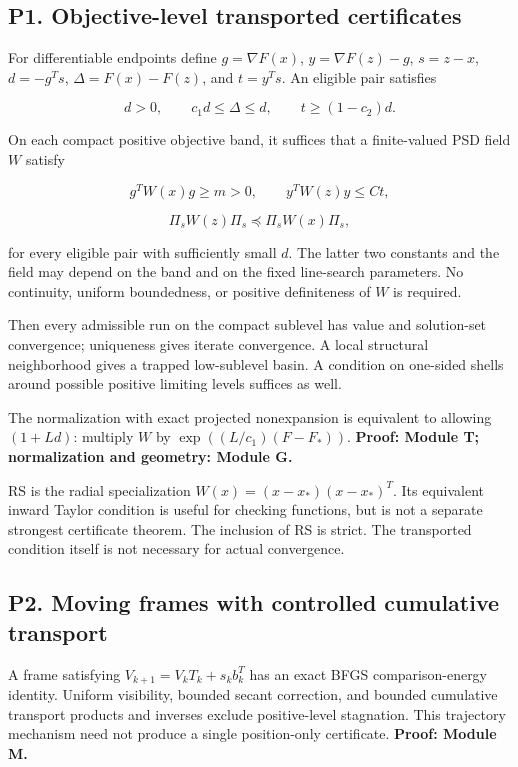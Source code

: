 \documentclass[10pt,oneside,openany]{book}
\theoremstyle{remark}\newtheorem{remark}{Remark}[chapter]
\begin{document}
\subsection{P1. Objective-level transported certificates}\label{p1.-objective-level-transported-certificates}

For differentiable endpoints define \(g=\nabla F(x)\), \(y=\nabla F(z)-g\), \(s=z-x\), \(d=-g^Ts\), \(\Delta=F(x)-F(z)\), and \(t=y^Ts\). An eligible pair satisfies

\[d>0,\qquad c_1d\le\Delta\le d,\qquad t\ge(1-c_2)d.\]

On each compact positive objective band, it suffices that a finite-valued PSD field \(W\) satisfy

\[g^TW(x)g\ge m>0,\qquad y^TW(z)y\le Ct,\]

\[\Pi_sW(z)\Pi_s\preceq\Pi_sW(x)\Pi_s,\]

for every eligible pair with sufficiently small \(d\). The latter two constants and the field may depend on the band and on the fixed line-search parameters. No continuity, uniform boundedness, or positive definiteness of \(W\) is required.

Then every admissible run on the compact sublevel has value and solution-set convergence; uniqueness gives iterate convergence. A local structural neighborhood gives a trapped low-sublevel basin. A condition on one-sided shells around possible positive limiting levels suffices as well.

The normalization with exact projected nonexpansion is equivalent to allowing \((1+Ld)\): multiply \(W\) by \(\exp((L/c_1)(F-F_*))\). \textbf{Proof: Module T; normalization and geometry: Module G.}

RS is the radial specialization \(W(x)=(x-x_*)(x-x_*)^T\). Its equivalent inward Taylor condition is useful for checking functions, but is not a separate strongest certificate theorem. The inclusion of RS is strict. The transported condition itself is not necessary for actual convergence.

\subsection{P2. Moving frames with controlled cumulative transport}\label{p2.-moving-frames-with-controlled-cumulative-transport}

A frame satisfying \(V_{k+1}=V_kT_k+s_kb_k^T\) has an exact BFGS comparison-energy identity. Uniform visibility, bounded secant correction, and bounded cumulative transport products and inverses exclude positive-level stagnation. This trajectory mechanism need not produce a single position-only certificate. \textbf{Proof: Module M.}
\end{document}
